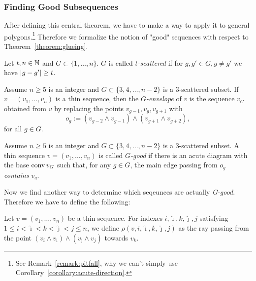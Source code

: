 \subsubsection{Finding Good Subsequences}

After defining this central theorem, we have to make a way to apply it to general polygons.\footnote{See Remark~\ref{remark:pitfall}, why we can't simply use Corollary~\ref{corollary:acute-direction}.}
Therefore we formalize the notion of "good" sequences with respect to Theorem~\ref{theorem:glueing}.

\begin{definition}
  Let $t, n \in \mathbb{N}$ and $G \subset \{1,\dots,n\}$. $G$ is called $t$\emph{-scattered} if for $g, g' \in G, g \neq g'$ we have $\lvert g-g'\rvert \geq t$.
\end{definition}

\begin{definition}[G-envelope]\label{definition:g-envelope}
  Assume $n\geq 5$ is an integer and $G\subset\{3,4,\dots,n-2\}$ is a $3$-scattered subset. If $v=(v_1,\dots,v_n)$ is a thin sequence, then the $G$\emph{-envelope} of $v$ is the sequence $v_G$ obtained from $v$ by replacing the points $v_{g-1}, v_g, v_{g+1}$ with $$o_g:=(v_{g-2}\wedge v_{g-1})\wedge (v_{g+1}\wedge v_{g+2}),$$ for all $g\in G$.
\end{definition}

\begin{definition}[G-good]
  Assume $n\geq 5$ is an integer and $G\subset\{3,4,\dots,n-2\}$ is a $3$-scattered subset. A thin sequence $v=(v_1,\dots,v_n)$ is called $G$\emph{-good} if there is an acute diagram with the base $\operatorname{conv} v_G$ such that, for any $g\in G$, the main edge passing from $o_g$ \emph{contains} $v_g$.
\end{definition}

Now we find another way to determine which seqeunces are actually \emph{G-good}. Therefore we have to define the following:

\begin{definition}
  Let $v=(v_1,\dots,v_n)$ be a thin sequence. For indexes $i,\hat{\imath},k, \hat{\jmath}, j$ satisfying $1\leq i<\hat{\imath}<k<\hat{\jmath}<j\leq n$, we define $\rho(v,i,\hat{\imath},k, \hat{\jmath}, j)$ as the ray passing from the point $(v_i\wedge v_{\hat{\imath}})\wedge(v_{\hat{\jmath}}\wedge v_j)$ towards $v_k$. 
\end{definition}

